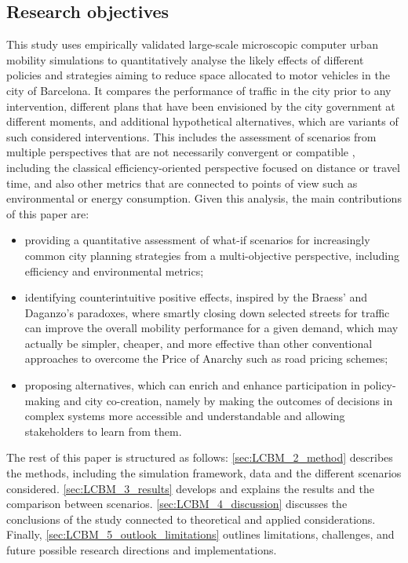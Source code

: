 \subsection{Research objectives}
\label{subsec:LCBM_1.2_research_objs}
This study uses empirically validated large-scale microscopic computer urban mobility simulations to quantitatively analyse the likely effects of different policies and strategies aiming to reduce space allocated to motor vehicles in the city of Barcelona. It compares the performance of traffic in the city prior to any intervention, different plans that have been envisioned by the city government at different moments, and additional hypothetical alternatives, which are variants of such considered interventions. This includes the assessment of scenarios from multiple perspectives that are not necessarily convergent or compatible \citep{Deb2014}, including the classical efficiency-oriented perspective focused on distance or travel time, and also other metrics that are connected to points of view such as environmental or energy consumption. Given this analysis, the main contributions of this paper are:
\begin{itemize}
    \item providing a quantitative assessment of what-if scenarios for increasingly common city planning strategies from a multi-objective perspective, including efficiency and environmental metrics;
    \item identifying counterintuitive positive effects, inspired by the Braess’ and Daganzo’s paradoxes, where smartly closing down selected streets for traffic can improve the overall mobility performance for a given demand, which may actually be simpler, cheaper, and more effective than other conventional approaches to overcome the Price of Anarchy such as road pricing schemes;
    \item proposing alternatives, which can enrich and enhance participation in policy-making and city co-creation, namely by making the outcomes of decisions in complex systems more accessible and understandable and allowing stakeholders to learn from them.
\end{itemize}
The rest of this paper is structured as follows: \cref{sec:LCBM_2_method} describes the methods, including the simulation framework, data and the different scenarios considered. \cref{sec:LCBM_3_results} develops and explains the results and the comparison between scenarios. \cref{sec:LCBM_4_discussion} discusses the conclusions of the study connected to theoretical and applied considerations. Finally, \cref{sec:LCBM_5_outlook_limitations} outlines limitations, challenges, and future possible research directions and implementations.

